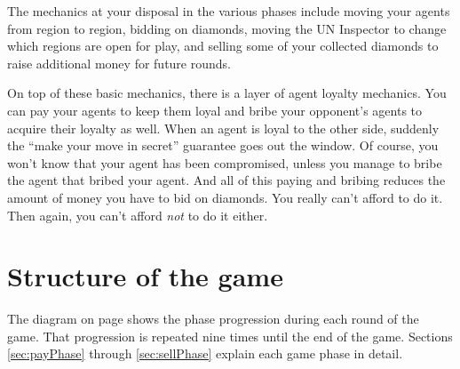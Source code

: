 \documentclass[8pt]{extbook}
\begin{document}
The mechanics at your disposal in the various phases include moving your agents from region to region, bidding on diamonds, moving the UN Inspector to change which regions are open for play, and selling some of your collected diamonds to raise additional money for future rounds.

On top of these basic mechanics, there is a layer of agent loyalty mechanics.  You can pay your agents to keep them loyal and bribe your opponent's agents to acquire their loyalty as well.  When an agent is loyal to the other side, suddenly the ``make your move in secret'' guarantee goes out the window.  Of course, you won't know that your agent has been compromised, unless you manage to bribe the agent that bribed your agent.  And all of this paying and bribing reduces the amount of money you have to bid on diamonds.  You really can't afford to do it.  Then again, you can't afford {\it not} to do it either.

\section{Structure of the game}

The diagram on page \pageref{fig:gameFlow} shows the phase progression during each round of the game.  That progression is repeated nine times until the end of the game.  Sections \ref{sec:payPhase} through \ref{sec:sellPhase} explain each game phase in detail.
\end{document}
